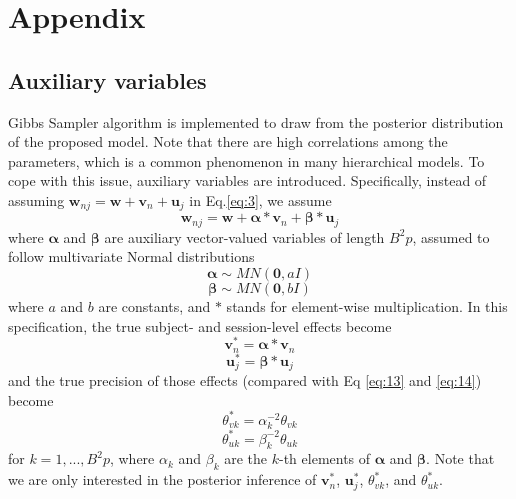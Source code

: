 \documentclass[12pt]{elsarticle}
\begin{document}
		
		\section{Appendix}
		
		\subsection{Auxiliary variables}
		Gibbs Sampler algorithm is implemented to draw from the posterior distribution of the proposed model. 
		Note that there are high correlations among the parameters, which is a common phenomenon in many hierarchical models.
		To cope with this issue, auxiliary variables are introduced. 
		Specifically, instead of assuming $\boldsymbol{w}_{nj} = \boldsymbol{w} + \boldsymbol{v}_n + \boldsymbol{u}_j$ in Eq.\ref{eq:3}, we assume
		\begin{equation} \label{eq:18}
			\boldsymbol{w}_{nj} = \boldsymbol{w} + \boldsymbol{\alpha}*\boldsymbol{v}_{n} + \boldsymbol{\beta}*\boldsymbol{u}_{j}
		\end{equation}
		where $\boldsymbol{\alpha}$ and $\boldsymbol{\beta}$ are auxiliary vector-valued variables of length $B^2p$, assumed to follow multivariate Normal distributions
		\begin{equation} \label{eq:19}
			\boldsymbol{\alpha} \sim  MN(\boldsymbol{0},aI)
		\end{equation}
		\begin{equation} \label{eq:20}
			\boldsymbol{\beta} \sim  MN(\boldsymbol{0},bI)
		\end{equation}
		where $a$ and $b$ are constants, and $*$ stands for element-wise multiplication. 
		In this specification, the true subject- and session-level effects become 
		\begin{equation} \label{eq:21}
			\boldsymbol{v}_{n}^{*} = \boldsymbol{\alpha} * \boldsymbol{v}_{n}
		\end{equation}
		\begin{equation} \label{eq:22}
			\boldsymbol{u}_{j}^{*} = \boldsymbol{\beta} * \boldsymbol{u}_{j}
		\end{equation}
		and the true precision of those effects (compared with Eq \ref{eq:13} and \ref{eq:14}) become
		\begin{equation} \label{eq:23}
			\theta_{vk}^{*} = \alpha_k^{-2}\theta_{vk} 
		\end{equation}
		\begin{equation} \label{eq:24}
			\theta_{uk}^{*} = \beta_k^{-2}\theta_{uk} 
		\end{equation}
		for $k=1,...,B^2p$, where  $\alpha_k$ and $\beta_k$ are the $k$-th elements of $\boldsymbol{\alpha}$ and $\boldsymbol{\beta}$.
		Note that we are only interested in the posterior inference of $\boldsymbol{v}_{n}^{*}$,  $\boldsymbol{u}_{j}^{*}$, $\theta_{vk}^{*}$, and $\theta_{uk}^{*}$.  
		
\end{document}
